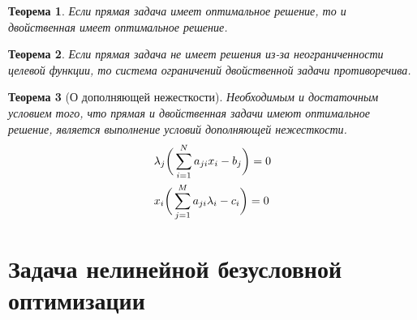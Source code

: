 \documentclass[12pt]{article}
\newtheorem{theorem}{Теорема}[section]
\theoremstyle{definition}
\theoremstyle{remark}
\begin{document}
\begin{theorem}
Если прямая задача имеет оптимальное решение, то и двойственная имеет оптимальное решение.
\end{theorem}

\begin{theorem}
Если прямая задача не имеет решения из-за неограниченности целевой функции, то система ограничений двойственной задачи противоречива.
\end{theorem}

\begin{theorem}[О дополняющей нежесткости]
Необходимым и достаточным условием того, что прямая и двойственная задачи имеют оптимальное решение, является выполнение условий дополняющей нежесткости.
\begin{align}
  &\lambda_j\bigg(\sum_{i=1}^N a_{ji}x_i-b_j\bigg)=0\\
  &x_i\bigg(\sum_{j=1}^M a_{ji}\lambda_i-c_i\bigg)=0\notag
\end{align}
\end{theorem}

\section{Задача нелинейной безусловной оптимизации}
\end{document}

